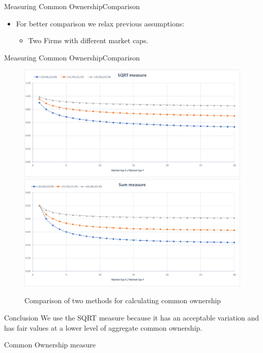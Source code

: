 \documentclass{beamer}
\begin{document}
			
			
			\begin{frame}{Measuring Common Ownership}{Comparison}
				\begin{itemize}
					\item For better comparison we relax previous assumptions:
					\begin{itemize}
						\item Two Firms with different market caps.
					\end{itemize}
				\end{itemize}
				\resizebox{0.7\textwidth}{!}
				{
					
				}
				
				
			\end{frame}
			
			
			\begin{frame}{Measuring Common Ownership}{Comparison}
				\begin{figure}[htbp]
					\includegraphics[width=0.47\linewidth]{3.png}
					\includegraphics[width=0.47\linewidth]{4.png}
					\captionsetup{labelformat=empty}
					\caption{\scriptsize Comparison of two methods for calculating common ownership}
				\end{figure}
				\begin{block}{Conclusion}
					We use the SQRT measure because it has an acceptable variation and has fair values at a lower level of aggregate common ownership. 
				\end{block}
			\end{frame}
		\begin{frame}{Common Ownership measure}	
			\begin{table}[htbp]
						\centering
					\resizebox{1\textwidth}{!}{
						}
			\end{table}
		\end{frame}	
		
\end{document}
